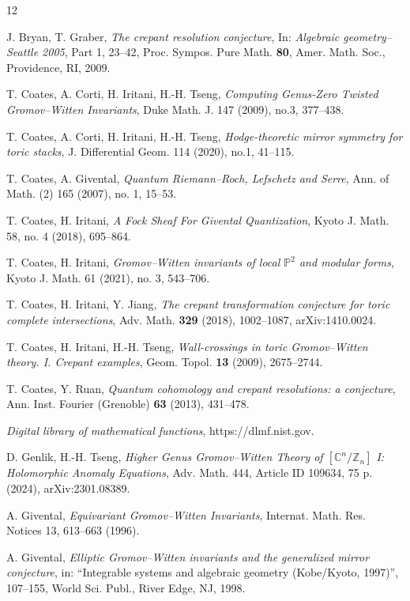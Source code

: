 \documentclass[12pt]{amsart}
\numberwithin{equation}{section}
\begin{document}
\begin{thebibliography}{12}

 J. Bryan, T. Graber, {\em The crepant resolution conjecture}, In: {\em Algebraic geometry--Seattle 2005}, Part 1, 23--42, Proc. Sympos. Pure Math. {\bf 80}, Amer. Math. Soc., Providence, RI, 2009.

 T. Coates, A. Corti, H. Iritani, H.-H. Tseng, {\em  Computing Genus-Zero Twisted Gromov--Witten Invariants},  Duke Math. J. 147 (2009), no.3, 377--438.

 T. Coates, A. Corti, H. Iritani, H.-H. Tseng, {\em Hodge-theoretic mirror symmetry for toric stacks}, J. Differential Geom. 114 (2020), no.1, 41--115.

 T. Coates, A. Givental, {\em Quantum Riemann--Roch, Lefschetz and Serre}, Ann. of Math. (2) 165 (2007), no. 1, 15--53.

 T. Coates, H. Iritani, {\em A Fock Sheaf For Givental Quantization}, Kyoto J. Math. 58, no. 4 (2018), 695--864.

 T. Coates, H. Iritani, {\em Gromov--Witten invariants of local $\mathbb{P}^2$ and modular forms}, Kyoto J. Math. 61 (2021), no. 3, 543--706.

 T. Coates, H. Iritani, Y. Jiang, {\em The crepant transformation conjecture for toric complete intersections}, Adv. Math. {\bf 329} (2018), 1002--1087, arXiv:1410.0024.

 T. Coates, H. Iritani, H.-H. Tseng, {\em Wall-crossings in toric Gromov--Witten theory. I. Crepant examples}, Geom. Topol. {\bf 13} (2009), 2675--2744.

 T. Coates, Y. Ruan, {\em Quantum cohomology and crepant resolutions: a conjecture}, Ann. Inst. Fourier (Grenoble) {\bf 63} (2013), 431--478.

 {\em Digital library of mathematical functions}, https://dlmf.nist.gov.

 D. Genlik, H.-H. Tseng, {\em Higher Genus Gromov--Witten Theory of $[\mathbb{C}^n/\mathbb{Z}_n]$ I: Holomorphic Anomaly Equations}, Adv. Math. 444, Article ID 109634, 75 p. (2024), arXiv:2301.08389. 

 A. Givental, {\em Equivariant Gromov--Witten Invariants}, Internat. Math. Res. Notices 13, 613--663 (1996). 

 A. Givental, {\em Elliptic Gromov--Witten invariants and the generalized mirror conjecture}, in: ``Integrable systems and algebraic geometry (Kobe/Kyoto, 1997)'', 107--155, World Sci. Publ., River Edge, NJ, 1998.


\end{thebibliography}
\end{document}
